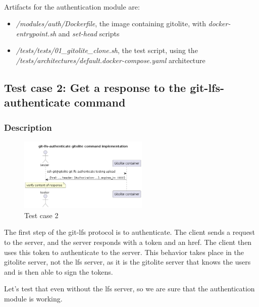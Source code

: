 \paragraph{}
Artifacts for the authentication module are:

\begin{itemize}
    \item \textit{/modules/auth/Dockerfile}, the image containing gitolite, with \textit{docker-entrypoint.sh} and \textit{set-head} scripts
    \item \textit{/tests/tests/01\_gitolite\_clone.sh}, the test script, using the \textit{/tests/architectures/default.docker-compose.yaml} architecture
\end{itemize}

\subsection{Test case 2: Get a response to the git-lfs-authenticate command}

\subsubsection{Description}
\begin{figure}
    \begin{center}
        \includegraphics[width=0.55\textwidth]{prototyping/diagrams/gitolite_lfs_authenticate}
    \end{center}
    \caption{Test case 2}
\end{figure}


The first step of the git-lfs protocol is to authenticate. The client sends a request to the server, and the server responds with a token and an href. The client then uses this token to authenticate to the server. This behavior takes place in the gitolite server, not the lfs server, as it is the gitolite server that knows the users and is then able to sign the tokens. 

Let's test that even without the lfs server, so we are sure that the authentication module is working.

